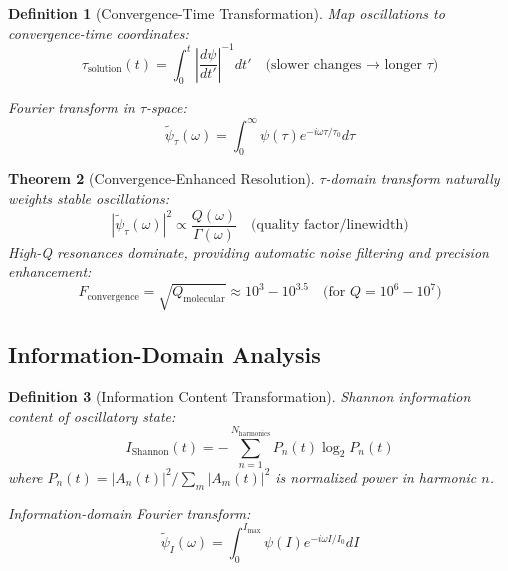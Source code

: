 \documentclass[12pt,a4paper]{article}
\newtheorem{theorem}{Theorem}[section]
\newtheorem{definition}[theorem]{Definition}
\begin{document}
\begin{definition}[Convergence-Time Transformation]
Map oscillations to convergence-time coordinates:
\begin{equation}
\tau_{\text{solution}}(t) = \int_0^t \left|\frac{d\psi}{dt'}\right|^{-1} dt' \quad \text{(slower changes → longer } \tau)
\end{equation}

Fourier transform in $\tau$-space:
\begin{equation}
\tilde{\psi}_{\tau}(\omega) = \int_0^{\infty} \psi(\tau) e^{-i\omega\tau/\tau_0} d\tau
\end{equation}
\end{definition}

\begin{theorem}[Convergence-Enhanced Resolution]
$\tau$-domain transform naturally weights stable oscillations:
\begin{equation}
|\tilde{\psi}_{\tau}(\omega)|^2 \propto \frac{Q(\omega)}{\Gamma(\omega)} \quad \text{(quality factor/linewidth)}
\end{equation}
High-Q resonances dominate, providing automatic noise filtering and precision enhancement:
\begin{equation}
F_{\text{convergence}} = \sqrt{Q_{\text{molecular}}} \approx 10^{3} - 10^{3.5} \quad \text{(for } Q = 10^6 - 10^7)
\end{equation}
\end{theorem}

\subsection{Information-Domain Analysis}

\begin{definition}[Information Content Transformation]
Shannon information content of oscillatory state:
\begin{equation}
I_{\text{Shannon}}(t) = -\sum_{n=1}^{N_{\text{harmonics}}} P_n(t) \log_2 P_n(t)
\end{equation}
where $P_n(t) = |A_n(t)|^2 / \sum_m |A_m(t)|^2$ is normalized power in harmonic $n$.

Information-domain Fourier transform:
\begin{equation}
\tilde{\psi}_I(\omega) = \int_0^{I_{\text{max}}} \psi(I) e^{-i\omega I/I_0} dI
\end{equation}
\end{definition}
\end{document}
